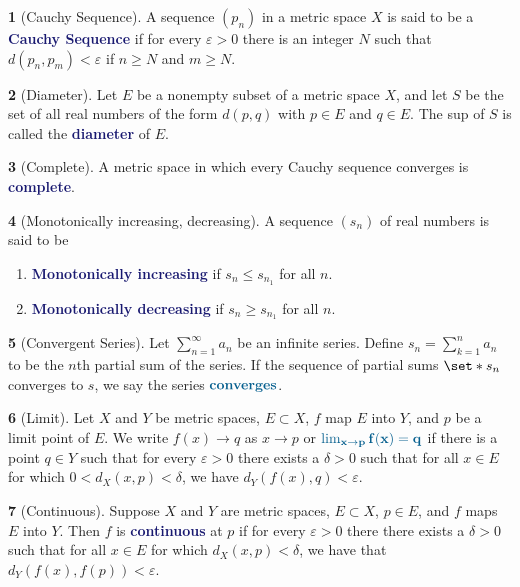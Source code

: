 \documentclass[12pt]{article}
\numberwithin{equation}{section}
\newcommand{\navy}[1]{\textcolor{MidnightBlue}{\bf #1}}
\theoremstyle{plain}
\theoremstyle{definition}
\newtheorem{definition}{\color{MidnightBlue}{\textbf{Definition}}}[section]
\def\Set{\set*}%
\newcommand{\1}{\mathbbm 1}
\def\d{\delta}
\newcommand{\e}{\varepsilon}
\begin{document}
\begin{definition}[Cauchy Sequence]
A sequence $(p_n)$ in a metric space $X$ is said to be a \navy{Cauchy Sequence} if for every $\e > 0$ there is an integer $N$ such that $d(p_n, p_m) < \e$ if $n \geq N$ and $m \geq N$.
\end{definition}

\begin{definition}[Diameter]
Let $E$ be a nonempty subset of a metric space $X$, and let $S$ be the set of all real numbers of the form $d(p,q)$ with $p \in E$ and $q \in E$. The sup of $S$ is called the \navy{diameter} of $E$.
\end{definition}

\begin{definition}[Complete]
A metric space in which every Cauchy sequence converges is \navy{complete}.
\end{definition}

\begin{definition}[Monotonically increasing, decreasing]
A sequence $(s_n)$ of real numbers is said to be
\begin{enumerate}
\item \navy{Monotonically increasing} if $s_n \leq s_{n_1}$ for all $n$.
\item \navy{Monotonically decreasing} if $s_n \geq s_{n_1}$ for all $n$.
\end{enumerate}
\end{definition}

\begin{definition}[Convergent Series]
Let $\sum_{n=1}^\infty a_n$ be an infinite series. Define $s_n = \sum_{k=1}^n a_n$ to be the $n$th partial sum of the series. If the sequence of partial sums $\Set{s_n}$ converges to $s$, we say the series $\navy{converges}$.
\end{definition}

\begin{definition}[Limit]
Let $X$ and $Y$ be metric spaces, $E \subset X$, $f$ map $E$ into $Y$, and $p$ be a limit point of $E$. We write $f(x) \to q$ as $x \to p$ or $\navy{\lim_{x\to p} f(x) = q}$ if there is a point $q \in Y$ such that for every $\e > 0$ there exists a $\d > 0$ such that for all $x \in E$ for which $0 < d_X(x,p) < \d$, we have $d_Y(f(x),q) < \e$.
\end{definition}

\begin{definition}[Continuous]
Suppose $X$ and $Y$ are metric spaces, $E \subset X$, $p \in E$, and $f$ maps $E$ into $Y$. Then $f$ is \navy{continuous} at $p$ if for every $\e > 0$ there there exists a $\d > 0$ such that for all $x \in E$ for which $d_X(x,p) < \d$, we have that $d_Y(f(x), f(p)) < \e$.
\end{definition}
\end{document}
